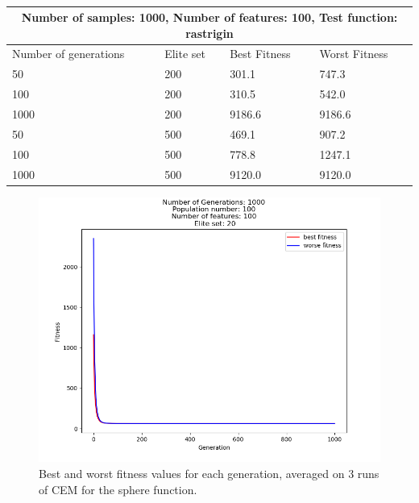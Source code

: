 \documentclass{article}
\begin{document}
\begin{table}[h]
	\begin{tabular}{ |p{3cm}||p{3cm}|p{3cm}|p{3cm}|  }
		\hline
		\multicolumn{4}{|c|}{Number of samples: 1000, Number of features: 100, Test function: rastrigin} \\
		\hline
		Number of generations& Elite set & Best Fitness & Worst Fitness\\
		\hline
		50   & 200    &301.1&   747.3\\
		100 &   200  & 310.5  &542.0\\
		1000 & 200 & 9186.6&  9186.6\\
		50    &500 & 469.1&  907.2\\
		100&   500  & 778.8& 1247.1\\
		1000& 500  & 9120.0  &9120.0\\
		
		\hline
	\end{tabular}
	\caption{\label{tab:table2.1} }
\end{table}

\begin{figure}
	\centering
	\includegraphics[width=\textwidth]{CEM_d_sphere.png}
	\caption{ Best and worst fitness values for each generation, averaged on 3 runs of CEM for the sphere function.}
	\label{fig:image3}
\end{figure}
\end{document}
